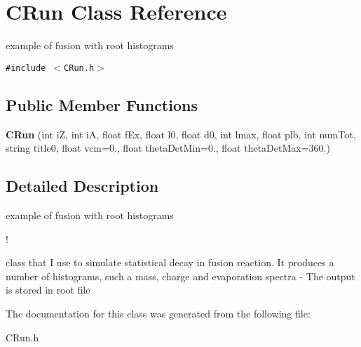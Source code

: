 \section{CRun Class Reference}
\label{classCRun}
example of fusion with root histograms  


{\tt \#include $<$CRun.h$>$}

\subsection*{Public Member Functions}
\begin{CompactItemize}
\item 
\textbf{CRun} (int i\-Z, int i\-A, float f\-Ex, float l0, float d0, int lmax, float plb, int num\-Tot, string title0, float vcm=0., float theta\-Det\-Min=0., float theta\-Det\-Max=360.)\label{classCRun_01e26f72913747034ef1d2f76f3b70f7}

\end{CompactItemize}


\subsection{Detailed Description}
example of fusion with root histograms 

!

class that I use to simulate statistical decay in fusion reaction. It produces a number of histograms, such a mass, charge and evaporation spectra - The output is stored in root file 



The documentation for this class was generated from the following file:\begin{CompactItemize}
\item 
CRun.h\end{CompactItemize}
